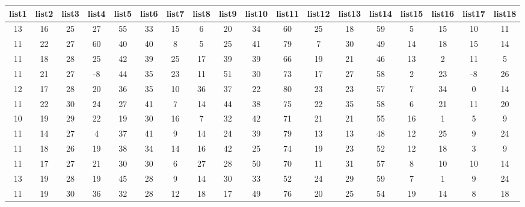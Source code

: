 \begin{sidewaystable}
    \centering
\begin{tabular}{cccccccccccccccccc}
list1 & list2 & list3 & list4 & list5 & list6 & list7 & list8 & list9 & list10 & list11 & list12 & list13 & list14 & list15 & list16 & list17 & list18 \\ \hline
    13    & 16    & 25    & 27    & 55    & 33    & 15    & 6     & 20    & 34     & 60     & 25     & 18     & 59     & 5      & 15     & 10     & 11     \\
    11    & 22    & 27    & 60    & 40    & 40    & 8     & 5     & 25    & 41     & 79     & 7      & 30     & 49     & 14     & 18     & 15     & 14     \\
    11    & 18    & 28    & 25    & 42    & 39    & 25    & 17    & 39    & 39     & 66     & 19     & 21     & 46     & 13     & 2      & 11     & 5      \\
    11    & 21    & 27    & -8    & 44    & 35    & 23    & 11    & 51    & 30     & 73     & 17     & 27     & 58     & 2      & 23     & -8     & 26     \\
    12    & 17    & 28    & 20    & 36    & 35    & 10    & 36    & 37    & 22     & 80     & 23     & 23     & 57     & 7      & 34     & 0      & 14     \\
    11    & 22    & 30    & 24    & 27    & 41    & 7     & 14    & 44    & 38     & 75     & 22     & 35     & 58     & 6      & 21     & 11     & 20     \\
    10    & 19    & 29    & 22    & 19    & 30    & 16    & 7     & 32    & 42     & 71     & 21     & 21     & 55     & 16     & 1      & 5      & 9      \\
    11    & 14    & 27    & 4     & 37    & 41    & 9     & 14    & 24    & 39     & 79     & 13     & 13     & 48     & 12     & 25     & 9      & 24     \\
    11    & 18    & 26    & 19    & 38    & 34    & 14    & 16    & 42    & 25     & 74     & 19     & 23     & 52     & 12     & 18     & 3      & 9      \\
    11    & 17    & 27    & 21    & 30    & 30    & 6     & 27    & 28    & 50     & 70     & 11     & 31     & 57     & 8      & 10     & 10     & 14     \\
    13    & 19    & 28    & 19    & 45    & 28    & 9     & 14    & 30    & 33     & 52     & 24     & 29     & 59     & 7      & 1      & 9      & 24     \\
    11    & 19    & 30    & 36    & 32    & 28    & 12    & 18    & 17    & 49     & 76     & 20     & 25     & 54     & 19     & 14     & 8      & 18     \\

\end{tabular}
\end{sidewaystable}
